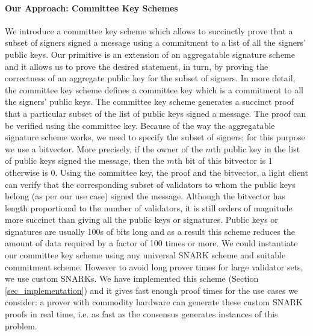 \paragraph{Our Approach: Committee Key Schemes} We introduce a committee key scheme which allows to succinctly prove that a subset of signers 
signed a message using a commitment to a list of all the signers' public keys. Our primitive is an extension of an aggregatable signature scheme and 
it allows us to prove the desired statement, in turn, by proving the correctness of an aggregate public key for the subset of signers. 
In more detail, the committee key scheme defines a committee key which is a commitment to all the signers' public keys. The committee 
key scheme generates a succinct proof that a particular subset of the list of public keys signed a message. The proof can be verified using the committee key. 
Because of the way the aggregatable signature scheme works, we need to specify the subset of signers; for this purpose we use a bitvector. 
More precisely, if the owner of the $m$th public key in the list of public keys signed the message, then the $m$th bit of this bitvector is $1$ otherwise is $0$.
Using the committee key, the proof and the bitvector, a light client can verify that the corresponding subset of validators to whom the 
public keys belong (as per our use case) signed the message. Although the bitvector has length proportional to the number of validators, it is still orders of magnitude 
more succinct than giving all the public keys or signatures. Public keys or signatures are usually 100s of bits long and as a result this scheme reduces the amount of 
data required by a factor of 100 times or more. We could instantiate our committee key scheme using any universal SNARK scheme and suitable commitment scheme. 
However to avoid long prover times for large validator sets, we use custom SNARKs. We have implemented this scheme 
(Section \ref{sec_implementation}) and it gives fast enough proof times for the use cases we consider: a prover with 
commodity hardware can generate these custom SNARK proofs in real time, i.e. as fast as the consensus generates instances of this problem.

